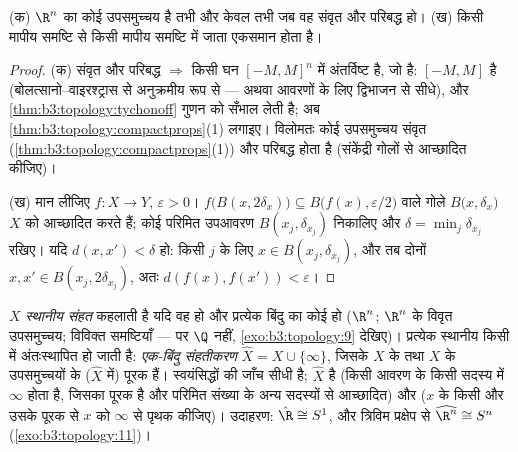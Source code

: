 \begin{corollary}[हाइने--बोरेल; हाइने]
\label{cor:b3:topology:heineborel}
(क) $\R^n$ का कोई उपसमुच्चय  है तभी और केवल तभी जब वह संवृत
और परिबद्ध हो।
(ख) किसी  मापीय समष्टि से किसी मापीय समष्टि में जाता  एकसमान  होता है।
\end{corollary}

\begin{proof}
(क) संवृत और परिबद्ध $\Rightarrow$ किसी घन $[-M,M]^n$ में अंतर्विष्ट है, जो
 है: $[-M, M]$  है (बोलत्सानो--वाइरश्ट्रास से अनुक्रमीय रूप
से --- अथवा आवरणों के लिए द्विभाजन से सीधे), और \cref{thm:b3:topology:tychonoff} गुणन को
सँभाल लेती है; अब \cref{thm:b3:topology:compactprops}(1) लगाइए। विलोमतः कोई  उपसमुच्चय
संवृत (\cref{thm:b3:topology:compactprops}(1)) और परिबद्ध होता है (संकेंद्री गोलों से आच्छादित
कीजिए)।

(ख) मान लीजिए $f \colon X \to Y$, $\varepsilon > 0$। $f\bigl(B(x,
2\delta_x)\bigr)\subseteq B\bigl(f(x), \varepsilon/2\bigr)$ वाले गोले $B\bigl(x, \delta_x\bigr)$ $X$ को
आच्छादित करते हैं; कोई परिमित उपआवरण $B(x_j, \delta_{x_j})$ निकालिए और $\delta = \min_j \delta_{x_j}$
रखिए। यदि $d(x, x') < \delta$ हो: किसी $j$ के लिए $x
\in B(x_j, \delta_{x_j})$, और तब दोनों $x, x'
\in B(x_j, 2\delta_{x_j})$,
अतः $d(f(x), f(x')) < \varepsilon$।
\end{proof}

\begin{definition}\label{def:b3:topology:locallycompact}
$X$ \emph{स्थानीय संहत} कहलाती है
यदि वह  हो और प्रत्येक बिंदु का कोई   हो
($\R^n$; $\R^n$ के विवृत उपसमुच्चय; विविक्त समष्टियाँ --- पर $\Q$
नहीं, \cref{exo:b3:topology:9} देखिए)। प्रत्येक स्थानीय  किसी 
में अंतःस्थापित हो जाती है: \emph{एक-बिंदु
संहतीकरण} $\hat X = X
\cup \{\infty\}$, जिसके 
$X$ के  तथा $X$ के  उपसमुच्चयों के ($\hat X$
में) पूरक हैं। स्वयंसिद्धों की जाँच सीधी है; $\hat X$  है (किसी
आवरण के किसी सदस्य में $\infty$ होता है, जिसका पूरक  है और
परिमित संख्या के अन्य सदस्यों से आच्छादित) और  ($x$
के किसी   और उसके पूरक से $x$ को $\infty$ से पृथक
कीजिए)। उदाहरण: $\hat\R \cong S^1$, और त्रिविम प्रक्षेप से $\widehat{\R^n} \cong S^n$ (\cref{exo:b3:topology:11})।
\end{definition}

